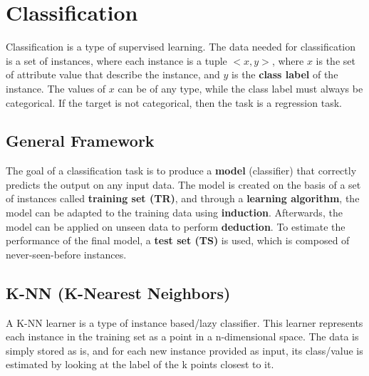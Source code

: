 \chapter{Classification}

Classification is a type of supervised learning. The data needed for classification is a set of instances, where each instance is a tuple $<x,y>$, where $x$ is the set of attribute value that describe the instance, and $y$ is the \textbf{class label} of the instance. The values of $x$ can be of any type, while the class label must always be categorical. If the target is not categorical, then the task is a regression task.

\section{General Framework}

The goal of a classification task is to produce a \textbf{model} (classifier) that correctly predicts the output on any input data. The model is created on the basis of a set of instances called \textbf{training set (TR)}, and through a \textbf{learning algorithm}, the model can be adapted to the training data using \textbf{induction}. Afterwards, the model can be applied on unseen data to perform \textbf{deduction}. To estimate the performance of the final model, a \textbf{test set (TS)} is used, which is composed of never-seen-before instances.

\section{K-NN (K-Nearest Neighbors)}

A K-NN learner is a type of instance based/lazy classifier. This learner represents each instance in the training set as a point in a n-dimensional space. The data is simply stored as is, and for each new instance provided as input, its class/value is estimated by looking at the label of the k points closest to it. 

